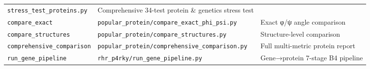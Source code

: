 \begin{longtable}[]{@{}lll@{}}
\begin{minipage}[t]{0.24\columnwidth}
\texttt{stress\_test\_proteins.py}\strut
\end{minipage} & \begin{minipage}[t]{0.43\columnwidth}\raggedright
Comprehensive 34-test protein \& genetics stress test\strut
\end{minipage}\tabularnewline
\begin{minipage}[t]{0.24\columnwidth}\raggedright
\texttt{compare\_exact}\strut
\end{minipage} & \begin{minipage}[t]{0.24\columnwidth}\raggedright
\texttt{popular\_protein/compare\_exact\_phi\_psi.py}\strut
\end{minipage} & \begin{minipage}[t]{0.43\columnwidth}\raggedright
Exact φ/ψ angle comparison\strut
\end{minipage}\tabularnewline
\begin{minipage}[t]{0.24\columnwidth}\raggedright
\texttt{compare\_structures}\strut
\end{minipage} & \begin{minipage}[t]{0.24\columnwidth}\raggedright
\texttt{popular\_protein/compare\_structures.py}\strut
\end{minipage} & \begin{minipage}[t]{0.43\columnwidth}\raggedright
Structure-level comparison\strut
\end{minipage}\tabularnewline
\begin{minipage}[t]{0.24\columnwidth}\raggedright
\texttt{comprehensive\_comparison}\strut
\end{minipage} & \begin{minipage}[t]{0.24\columnwidth}\raggedright
\texttt{popular\_protein/comprehensive\_comparison.py}\strut
\end{minipage} & \begin{minipage}[t]{0.43\columnwidth}\raggedright
Full multi-metric protein report\strut
\end{minipage}\tabularnewline
\begin{minipage}[t]{0.24\columnwidth}\raggedright
\texttt{run\_gene\_pipeline}\strut
\end{minipage} & \begin{minipage}[t]{0.24\columnwidth}\raggedright
\texttt{rhr\_p4rky/run\_gene\_pipeline.py}\strut
\end{minipage} & \begin{minipage}[t]{0.43\columnwidth}\raggedright
Gene→protein 7-stage B4 pipeline\strut
\end{minipage}\tabularnewline

\end{longtable}
